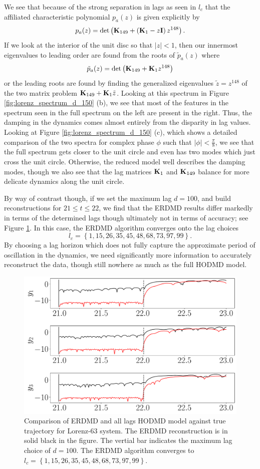 \documentclass[a4paper,11pt]{article}
\begin{document}
We see that because of the strong separation in lags as seen in $l_{c}$ that the affiliated characteristic polynomial $p_{a}(z)$ is given explicitly by
\[
p_{a}(z) = \text{det}\left({\bf K}_{149} + \left({\bf K}_{1}-z{\bf I}\right)z^{148} \right).
\]
If we look at the interior of the unit disc so that $|z|<1$, then our innermost eigenvalues to leading order are found from the roots of $\tilde{p}_{a}(z)$ where
\[
\tilde{p}_{a}(z) = \text{det}\left({\bf K}_{149} + {\bf K}_{1}z^{148}\right)
\]
or the leading roots are found by finding the generalized eigenvalues $\tilde{z}=z^{148}$ of the two matrix problem ${\bf K}_{149} + {\bf K}_{1}\tilde{z}$.  Looking at this spectrum in Figure \ref{fig:lorenz_spectrum_d_150} (b), we see that most of the features in the spectrum seen in the full spectrum on the left are present in the right.  Thus, the damping in the dynamics comes almost entirely from the disparity in lag values.  Looking at Figure \ref{fig:lorenz_spectrum_d_150} (c), which shows a detailed comparison of the two spectra for complex phase $\phi$ such that $|\phi|<\frac{\pi}{8}$, we see that the full spectrum gets closer to the unit circle and even has two modes which just cross the unit circle.  Otherwise, the reduced model well describes the damping modes, though we also see that the lag matrices ${\bf K}_{1}$ and ${\bf K}_{149}$ balance for more delicate dynamics along the unit circle.    

By way of contrast though, if we set the maximum lag $d=100$, and build reconstructions for $21\leq t \leq 22$, we find that the ERDMD results differ  markedly in terms of the determined lags though ultimately not in terms of accuracy; see Figure \ref{fig:lorenz_compare_d_100}.  In this case, the ERDMD algorithm converges onto the lag choices 
$$
l_{c}=\left\{1,15, 26, 35, 45, 48, 68, 73, 97,99\right\}.
$$  By choosing a lag horizon which does not fully capture the approximate period of oscillation in the dynamics, we need significantly more information to accurately reconstruct the data, though still nowhere as much as the full HODMD model.  
\begin{figure}[!h]
\centering
\includegraphics[width=.8\textwidth]{Lorenz_error_compare_w_mx_lag_100}
\caption{Comparison of ERDMD and all lags HODMD model against true trajectory for Lorenz-63 system.  The ERDMD reconstruction is in solid black in the figure.  The vertial bar indicates the maximum lag choice of $d=100$. The ERDMD algorithm converges to $l_{c}=\left\{1,15, 26, 35, 45, 48, 68, 73, 97,99\right\}$.}
\label{fig:lorenz_compare_d_100}
\end{figure}
 
\end{document}

